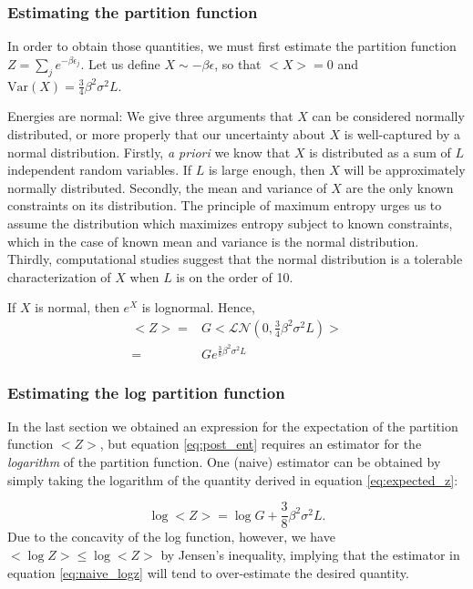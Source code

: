 \documentclass{article}
\newcommand{\ep}{\epsilon}
\newcommand{\Var}{\mathrm{Var}}
\begin{document}
\subsubsection{Estimating the partition function}
In order to obtain those quantities, we must first estimate the
partition function $Z = \sum_je^{-\beta\ep_j}$.  Let us define
$X\sim-\beta\ep$, so that $<X>=0$ and
$\Var(X)=\frac{3}{4}\beta^2\sigma^2L$.  

Energies are normal: We give three arguments that
$X$ can be considered normally distributed, or more properly that our
uncertainty about $X$ is well-captured by a normal distribution.
Firstly, \textit{a priori} we know that $X$ is distributed as a sum of
$L$ independent random variables.  If $L$ is large enough, then $X$
will be approximately normally distributed.  Secondly, the mean and
variance of $X$ are the only known constraints on its distribution.
The principle of maximum entropy urges us to assume the distribution
which maximizes entropy subject to known constraints, which in the
case of known mean and variance is the normal distribution.  Thirdly,
computational studies suggest that the normal distribution is a
tolerable characterization of $X$ when $L$ is on the order of 10.

If $X$ is normal, then $e^X$ is lognormal.  Hence, 
\begin{align}
  <Z> =& G<\mathcal{LN}(0,\frac{3}{4}\beta^2\sigma^2L)>\nonumber\\
  =&Ge^{\frac{3}{8}\beta^2\sigma^2L}
  \label{eq:expected_z}
\end{align}

\subsubsection{Estimating the log partition function}
In the last section we obtained an expression for the expectation of the partition function $<Z>$, but equation \ref{eq:post_ent} requires an estimator for the \textit{logarithm} of the partition function.  One (naive) estimator can be obtained by simply taking the logarithm of the quantity derived in equation \ref{eq:expected_z}:

\begin{equation}
  \log <Z> = \log G + \frac{3}{8}\beta^2\sigma^2L.
  \label{eq:naive_logz}
\end{equation}
Due to the concavity of the log function, however, we have
\hbox{$<\log Z>\leq \log <Z>$} by Jensen's inequality, implying that
the estimator in equation \ref{eq:naive_logz} will tend to
over-estimate the desired quantity.
\end{document}
